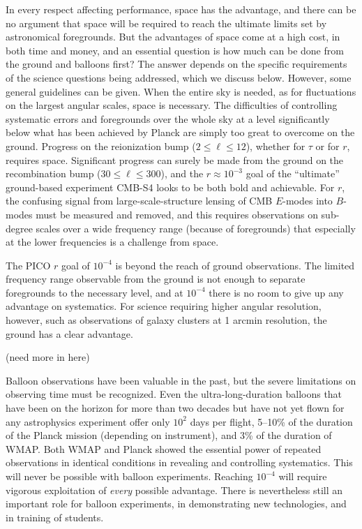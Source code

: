 \documentclass[PICOReport.tex]{subfiles}
\begin{document}
 \vskip 5pt


 In every respect affecting performance, space has the advantage, and there can be no argument that space will be required to reach the ultimate limits set by astronomical foregrounds.  But the advantages of space come at a high cost, in both time and money, and an essential question is how much can be done from the ground and balloons first?  The answer depends on the specific requirements of the science questions being addressed, which we discuss below. However, some general guidelines can be given.  When the entire sky is needed, as for fluctuations on the largest angular scales, space is necessary.  The difficulties of controlling systematic errors and foregrounds over the whole sky at a level significantly below what has been achieved by Planck are simply too great to overcome on the ground.  Progress on the reionization bump ($2\leq \ell \leq 12$), whether for $\tau$ or for $r$, requires space.  Significant progress can surely be made from the ground on the recombination bump ($30 \leq \ell \leq 300$), and the $r \approx 10^{-3}$ goal of the ``ultimate'' ground-based experiment CMB-S4 looks to be both bold and achievable.  For $r$, the confusing signal from large-scale-structure lensing of CMB $E$-modes into $B$-modes must be measured and removed, and this requires observations on sub-degree scales over a wide frequency range (because of foregrounds) that especially at the lower frequencies is a challenge from space.

 The PICO $r$ goal of $10^{-4}$ is beyond the reach of ground observations.  The limited frequency range observable from the ground is not enough to separate foregrounds to the necessary level, and at $10^{-4}$ there is no room to give up any advantage on systematics.  For science requiring higher angular resolution, however, such as observations of galaxy clusters at 1 arcmin resolution, the ground has a clear advantage.

 (need more in here)

 Balloon observations have been valuable in the past, but the severe limitations on observing time must be recognized.  Even the ultra-long-duration balloons that have been on the horizon for more than two decades but have not yet flown for any astrophysics experiment offer only $10^2$ days per flight, 5--10\% of the duration of the Planck mission (depending on instrument), and 3\% of the duration of WMAP.  Both WMAP and Planck showed the essential power of repeated observations in identical conditions in revealing and controlling systematics.  This will never be possible with balloon experiments.  Reaching $10^{-4}$ will require vigorous exploitation of {\it every\/} possible advantage.  There is nevertheless still an important role for balloon experiments, in demonstrating new technologies, and in training of students.




 
\end{document}

